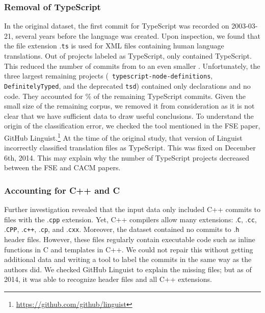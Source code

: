 \documentclass[acmsmall]{acmart}
\newcommand{\pct}[1]{#1\!\!\%\xspace}
\renewcommand{\c}{{\sf  C}\xspace}
\newcommand{\cpp}{{\sf  C++}\xspace}
\newcommand{\ts}{{\sf  TypeScript}\xspace}
\newcommand{\gh}{{GitHub}\xspace}
\newcommand{\code}[1]{{\tt\small #1}\xspace}
\begin{document}
\subsubsection{Removal of TypeScript}

In the original dataset, the first commit for \ts was recorded on
2003-03-21, several years before the language was created. Upon inspection,
we found that the file extension .\code{ts} is used for XML files containing
human language translations. Out of \initialNumTSProjects projects labeled
as \ts, only \realTSProjNum contained \ts. This reduced the number of
commits from \initialNumTSCommits to an even smaller \realTSCommitsNum.
Unfortunately, the three largest remaining projects (\code{\small
  typescript-node-definitions}, \code{\small Definitely\-Typed}, and the
deprecated \code{\small tsd}) contained only declarations and no code.  They
accounted for \pct{\ratioOfTypeDefTSCommits} of the remaining \ts commits.
Given the small size of the remaining corpus, we removed it from
consideration as it is not clear that we have sufficient data to draw useful
conclusions.  
To understand the origin of the classification error, we checked the tool
mentioned in the FSE paper, \gh
Linguist.\footnote{\url{https://github.com/github/linguist}} At the time of
the original study, that version of Linguist incorrectly classified
translation files as \ts. This was fixed on December 6th, 2014. This may
explain why the number of \ts projects decreased between the FSE and CACM
papers.

\subsubsection{Accounting for C++ and C}

Further investigation revealed that the input data only included \cpp
commits to files with the .\code{cpp} extension.  Yet, \cpp compilers allow
many extensions: .\code{C}, .\code{cc}, .\code{CPP}, .\code{c++},
.\code{cp}, and .\code{cxx}.  Moreover, the dataset contained no commits to
.\code{h} header files.  However, these files regularly contain executable
code such as inline functions in \c and templates in \cpp.  We could not
repair this without getting additional data and writing a tool to label the
commits in the same way as the authors did.  We checked \gh Linguist to
explain the missing files; but as of 2014, it was able to recognize header
files and all \cpp extensions.  
\end{document}
